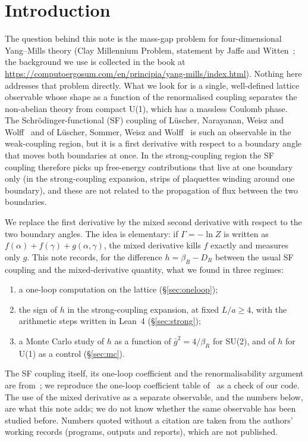\documentclass[11pt,a4paper]{article}
\theoremstyle{definition}
\theoremstyle{remark}
\newcommand{\gb}{\bar g^{2}}
\newcommand{\bR}{\beta_R}
\newcommand{\DR}{D_R}
\begin{document}
\section{Introduction}\label{sec:intro}

The question behind this note is the mass-gap problem for four-dimensional Yang--Mills theory (Clay Millennium Problem, statement by Jaffe and Witten~\cite{JW}; the background we use is collected in the book at \url{https://computoergosum.com/en/principia/yang-mills/index.html}). Nothing here addresses that problem directly. What we look for is a single, well-defined lattice observable whose shape as a function of the renormalised coupling separates the non-abelian theory from compact U(1), which has a massless Coulomb phase. The Schrödinger-functional (SF) coupling of Lüscher, Narayanan, Weisz and Wolff~\cite{LNWW} and of Lüscher, Sommer, Weisz and Wolff~\cite{LSWW} is such an observable in the weak-coupling region, but it is a first derivative with respect to a boundary angle that moves both boundaries at once. In the strong-coupling region the SF coupling therefore picks up free-energy contributions that live at one boundary only (in the strong-coupling expansion, strips of plaquettes winding around one boundary), and these are not related to the propagation of flux between the two boundaries.

We replace the first derivative by the mixed second derivative with respect to the two boundary angles. The idea is elementary: if $\Gamma=-\ln Z$ is written as $f(\alpha)+f(\gamma)+g(\alpha,\gamma)$, the mixed derivative kills $f$ exactly and measures only $g$. This note records, for the difference $h=\bR-\DR$ between the usual SF coupling and the mixed-derivative quantity, what we found in three regimes:
\begin{enumerate}[leftmargin=2em]
\item a one-loop computation on the lattice (\S\ref{sec:oneloop});
\item the sign of $h$ in the strong-coupling expansion, at fixed $L/a\ge4$, with the arithmetic steps written in Lean~4 (\S\ref{sec:strong});
\item a Monte Carlo study of $h$ as a function of $\gb=4/\bR$ for SU(2), and of $h$ for U(1) as a control (\S\ref{sec:mc}).
\end{enumerate}
The SF coupling itself, its one-loop coefficient and the renormalisability argument are from~\cite{LNWW,LSWW}; we reproduce the one-loop coefficient table of~\cite{LNWW} as a check of our code. The use of the mixed derivative as a separate observable, and the numbers below, are what this note adds; we do not know whether the same observable has been studied before. Numbers quoted without a citation are taken from the authors' working records (programs, outputs and reports), which are not published.
\end{document}

